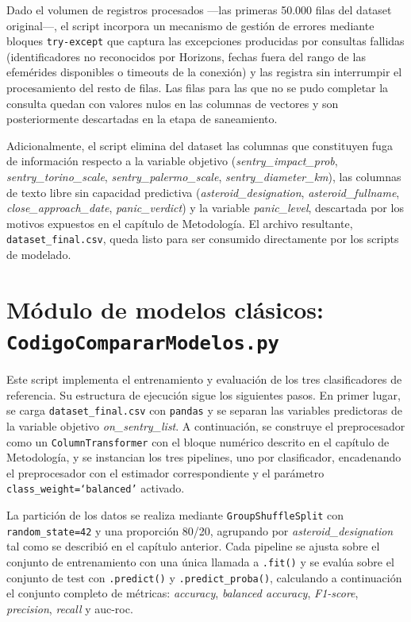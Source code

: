 \documentclass[12pt]{report} %
\begin{document}
Dado el volumen de registros procesados ---las primeras 50.000 filas del dataset original---, el script incorpora un mecanismo de gestión de errores mediante bloques \texttt{try-except} que captura las excepciones producidas por consultas fallidas (identificadores no reconocidos por Horizons, fechas fuera del rango de las efemérides disponibles o timeouts de la conexión) y las registra sin interrumpir el procesamiento del resto de filas. Las filas para las que no se pudo completar la consulta quedan con valores nulos en las columnas de vectores y son posteriormente descartadas en la etapa de saneamiento.
 
Adicionalmente, el script elimina del dataset las columnas que constituyen fuga de información respecto a la variable objetivo (\textit{sentry\_impact\_prob}, \textit{sentry\_torino\_scale}, \textit{sentry\_palermo\_scale}, \textit{sentry\_diameter\_km}), las columnas de texto libre sin capacidad predictiva (\textit{asteroid\_designation}, \textit{asteroid\_fullname}, \textit{close\_approach\_date}, \textit{panic\_verdict}) y la variable \textit{panic\_level}, descartada por los motivos expuestos en el capítulo de Metodología. El archivo resultante, \texttt{dataset\_final.csv}, queda listo para ser consumido directamente por los scripts de modelado.
 
\section{Módulo de modelos clásicos: \texttt{CodigoCompararModelos.py}}
 
Este script implementa el entrenamiento y evaluación de los tres clasificadores de referencia. Su estructura de ejecución sigue los siguientes pasos. En primer lugar, se carga \texttt{dataset\_final.csv} con \texttt{pandas} y se separan las variables predictoras de la variable objetivo \textit{on\_sentry\_list}. A continuación, se construye el preprocesador como un \texttt{ColumnTransformer} con el bloque numérico descrito en el capítulo de Metodología, y se instancian los tres pipelines, uno por clasificador, encadenando el preprocesador con el estimador correspondiente y el parámetro \texttt{class\_weight=`balanced'} activado.
 
La partición de los datos se realiza mediante \texttt{GroupShuffleSplit} con \texttt{random\_state=42} y una proporción 80/20, agrupando por \textit{asteroid\_designation} tal como se describió en el capítulo anterior. Cada pipeline se ajusta sobre el conjunto de entrenamiento con una única llamada a \texttt{.fit()} y se evalúa sobre el conjunto de test con \texttt{.predict()} y \texttt{.predict\_proba()}, calculando a continuación el conjunto completo de métricas: \textit{accuracy}, \textit{balanced accuracy}, \textit{F1-score}, \textit{precision}, \textit{recall} y \gls{auc}-\gls{roc}.
 
\end{document}
